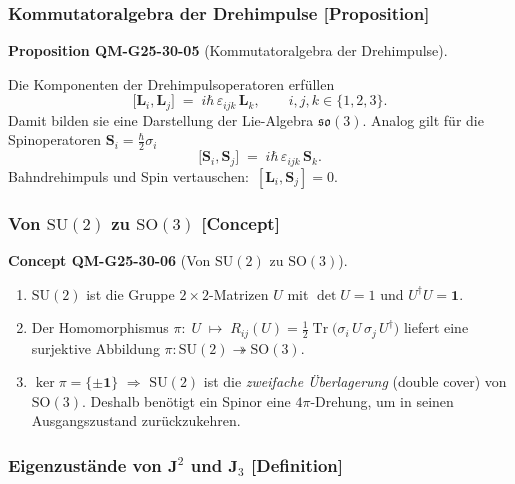 \documentclass[10pt, letterpaper]{article}
\newcommand{\CustomHeading}[3]{%
  \par\medskip\noindent%
  \textbf{#1 #2} \textnormal{(#3)}.\enskip%
}
\newenvironment{PROP}[2]{\begin{unitbox}\CustomHeading{Proposition}{#1}{#2}}{\end{unitbox}}
\newenvironment{CONC}[2]{\begin{unitbox}\CustomHeading{Concept}{#1}{#2}}{\end{unitbox}}
\begin{document}
\subsubsection*{Kommutatoralgebra der Drehimpulse [Proposition]}


\begin{PROP}{QM-G25-30-05}{Kommutatoralgebra der Drehimpulse}
Die Komponenten der Drehimpulsoperatoren erfüllen
\[
  \bigl[\mathbf L_i,\mathbf L_j\bigr] \;=\;
  i\hbar\,\varepsilon_{ijk}\,\mathbf L_k,
  \qquad i,j,k\in\{1,2,3\}.
\]
Damit bilden sie eine Darstellung der Lie-Algebra $\mathfrak{so}(3)$.
Analog gilt für die Spinoperatoren
$\mathbf S_i=\frac{\hbar}{2}\sigma_i$
\[
  \bigl[\mathbf S_i,\mathbf S_j\bigr]
  \;=\;
  i\hbar\,\varepsilon_{ijk}\,\mathbf S_k .
\]
Bahndrehimpuls und Spin vertauschen:
$\,[\mathbf L_i,\mathbf S_j]=0$.
\end{PROP}


\subsubsection*{Von $\mathrm{SU}(2)$ zu $\mathrm{SO}(3)$ [Concept]}

\begin{CONC}{QM-G25-30-06}{Von $\mathrm{SU}(2)$ zu $\mathrm{SO}(3)$}
\begin{enumerate}
  \item $\mathrm{SU}(2)$ ist die Gruppe $2{\times}2$-Matrizen
        $U$ mit $\det U=1$ und $U^\dagger U=\mathbf 1$.
  \item Der Homomorphismus  
        $\displaystyle
          \pi:\;U\;\mapsto\;
          R_{ij}(U)=\frac12\operatorname{Tr}\bigl(
                  \sigma_i\,U\,\sigma_j\,U^\dagger\bigr)
        $
        liefert eine surjektive Abbildung
        $\pi:\mathrm{SU}(2)\twoheadrightarrow\mathrm{SO}(3)$.
  \item $\ker\pi=\{\pm\mathbf 1\}$  $\Rightarrow$
        $\mathrm{SU}(2)$ ist die \emph{zweifache Überlagerung}
        (double cover) von $\mathrm{SO}(3)$.
        Deshalb benötigt ein Spinor eine $4\pi$-Drehung, um in
        seinen Ausgangszustand zurückzukehren.
\end{enumerate}
\end{CONC}


\subsubsection*{Eigenzustände von $\mathbf J^2$ und $\mathbf J_3$ [Definition]}
\end{document}
